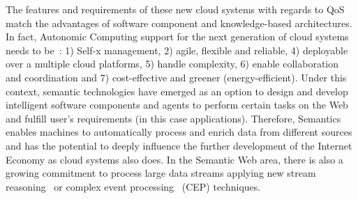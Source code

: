 The features and requirements of these new cloud systems with regards 
to QoS~\cite{Pedersen:2011:AMQ:2114495.2115542} match the advantages of software component and 
knowledge-based architectures. In fact, Autonomic Computing support for the next generation of cloud systems 
needs to be~\cite{Conejero:2012:MSQ:2357487.2357591,Pedersen:2011:AMQ:2114495.2115542}: 
1) Self-x management, 2) agile, flexible and reliable, 4) deployable over a multiple cloud platforms, 5) handle complexity, 6) enable 
collaboration and coordination and 7) cost-effective and greener 
(energy-efficient). Under this context, semantic technologies have emerged as an 
option to design and develop intelligent software components and agents to 
perform certain tasks on the Web and fulfill user's requirements (in this case 
applications). Therefore, Semantics enables machines to automatically process 
and enrich data from different sources and has the potential to deeply influence 
the further development of the Internet Economy as cloud systems also does. 
In the Semantic Web area, there is also a growing commitment to process large data streams applying 
new stream reasoning~\cite{Bolles:2008:SSE:1789394.1789438,Barbieri:2010:EEC:1739041.1739095} 
or complex event processing~\cite{Anicic:2011:EUL:1963405.1963495} (CEP) techniques. 

